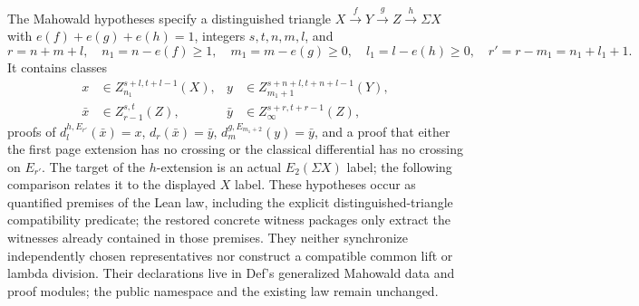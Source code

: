 \begin{definition}
  \label{def:mahowald-input-data}
  \notready
  The Mahowald hypotheses specify a distinguished triangle
  $X\xrightarrow fY\xrightarrow gZ\xrightarrow h\Sigma X$ with
  $e(f)+e(g)+e(h)=1$, integers $s,t,n,m,l$, and
  \[
    r=n+m+l,\quad n_1=n-e(f)\ge1,\quad
    m_1=m-e(g)\ge0,\quad l_1=l-e(h)\ge0,\quad
    r'=r-m_1=n_1+l_1+1.
  \]
  It contains classes
  \[
  \begin{aligned}
    x&\in Z_{n_1}^{s+l,t+l-1}(X),&
    y&\in Z_{m_1+1}^{s+n+l,t+n+l-1}(Y),\\
    \bar x&\in Z_{r-1}^{s,t}(Z),&
    \bar y&\in Z_\infty^{s+r,t+r-1}(Z),
  \end{aligned}
  \]
  proofs of $d_l^{h,E_{r'}}(\bar x)=x$, $d_r(\bar x)=\bar y$,
  $d_m^{g,E_{m_1+2}}(y)=\bar y$, and a proof that either the first page
  extension has no crossing or the classical differential has no crossing on
  $E_{r'}$.
  The target of the $h$-extension is an actual $E_2(\Sigma X)$
  label; the following comparison relates it to the displayed $X$ label.
  These hypotheses occur as quantified premises of the Lean law,
  including the explicit distinguished-triangle compatibility predicate;
  the restored concrete witness packages only extract the witnesses already
  contained in those premises. They neither synchronize independently chosen
  representatives nor construct a compatible common lift or lambda division.
  Their declarations live in Def's generalized Mahowald data and proof modules;
  the public namespace and the existing law remain unchanged.
\end{definition}

